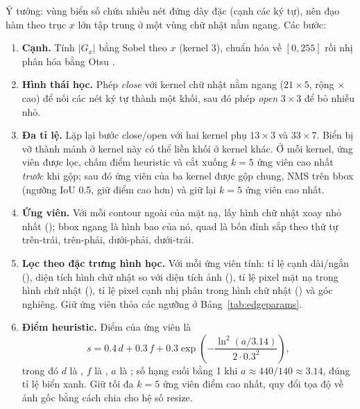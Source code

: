 Ý tưởng: vùng biển số chứa nhiều nét đứng dày đặc (cạnh các ký tự), nên đạo hàm theo trục $x$ lớn tập trung ở một vùng chữ nhật nằm ngang. Các bước:
\begin{enumerate}
  \item \textbf{Cạnh.} Tính $|G_x|$ bằng Sobel theo $x$ (kernel 3), chuẩn hóa về $[0,255]$ rồi nhị phân hóa bằng Otsu \cite{otsu}.
  \item \textbf{Hình thái học.} Phép \emph{close} với kernel chữ nhật nằm ngang ($21\times 5$, rộng $\times$ cao) để nối các nét ký tự thành một khối, sau đó phép \emph{open} $3\times 3$ để bỏ nhiễu nhỏ.
  \item \textbf{Đa tỉ lệ.} Lặp lại bước close/open với hai kernel phụ $13\times 3$ và $33\times 7$. Biển bị vỡ thành mảnh ở kernel này có thể liền khối ở kernel khác. Ở mỗi kernel, ứng viên được lọc, chấm điểm heuristic và cắt xuống $k=5$ ứng viên cao nhất \emph{trước} khi gộp; sau đó ứng viên của ba kernel được gộp chung, NMS trên bbox (ngưỡng IoU 0.5, giữ điểm cao hơn) và giữ lại $k=5$ ứng viên cao nhất.
  \item \textbf{Ứng viên.} Với mỗi contour ngoài của mặt nạ, lấy hình chữ nhật xoay nhỏ nhất (); bbox ngang là hình bao của nó, quad là bốn đỉnh sắp theo thứ tự trên-trái, trên-phải, dưới-phải, dưới-trái.
  \item {\sloppy \textbf{Lọc theo đặc trưng hình học.} Với mỗi ứng viên tính: tỉ lệ cạnh dài/ngắn (), diện tích hình chữ nhật so với diện tích ảnh (), tỉ lệ pixel mặt nạ trong hình chữ nhật (), tỉ lệ pixel cạnh nhị phân trong hình chữ nhật () và góc nghiêng. Giữ ứng viên thỏa các ngưỡng ở Bảng~\ref{tab:edgeparams}.\par}
  \item \textbf{Điểm heuristic.} Điểm của ứng viên là
  \begin{equation}
    s = 0.4\,d + 0.3\,f + 0.3\exp\!\left(-\frac{\ln^2(a/3.14)}{2\cdot 0.3^2}\right),
  \end{equation}
  trong đó $d$ là , $f$ là , $a$ là ; số hạng cuối bằng 1 khi $a\approx 440/140\approx 3.14$, đúng tỉ lệ biển xanh. Giữ tối đa $k=5$ ứng viên điểm cao nhất, quy đổi tọa độ về ảnh gốc bằng cách chia cho hệ số resize.
\end{enumerate}

